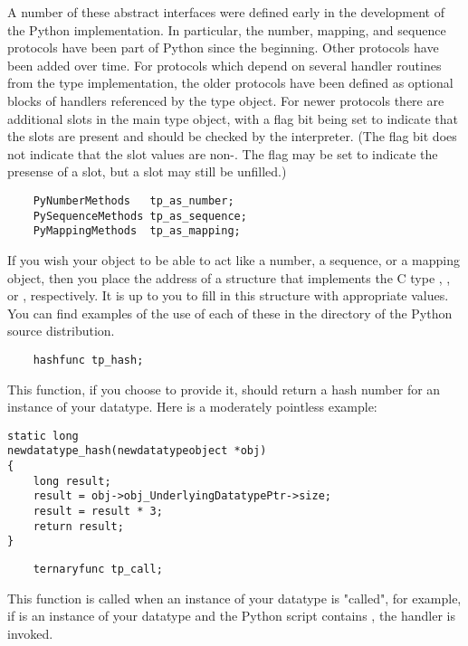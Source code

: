 A number of these abstract interfaces were defined early in the
development of the Python implementation.  In particular, the number,
mapping, and sequence protocols have been part of Python since the
beginning.  Other protocols have been added over time.  For protocols
which depend on several handler routines from the type implementation,
the older protocols have been defined as optional blocks of handlers
referenced by the type object.  For newer protocols there are
additional slots in the main type object, with a flag bit being set to
indicate that the slots are present and should be checked by the
interpreter.  (The flag bit does not indicate that the slot values are
non-\NULL. The flag may be set to indicate the presense of a slot,
but a slot may still be unfilled.)

\begin{verbatim}
    PyNumberMethods   tp_as_number;
    PySequenceMethods tp_as_sequence;
    PyMappingMethods  tp_as_mapping;
\end{verbatim}

If you wish your object to be able to act like a number, a sequence,
or a mapping object, then you place the address of a structure that
implements the C type ,
, or , respectively.
It is up to you to fill in this structure with appropriate values. You
can find examples of the use of each of these in the 
directory of the Python source distribution.


\begin{verbatim}
    hashfunc tp_hash;
\end{verbatim}

This function, if you choose to provide it, should return a hash
number for an instance of your datatype. Here is a moderately
pointless example:

\begin{verbatim}
static long
newdatatype_hash(newdatatypeobject *obj)
{
    long result;
    result = obj->obj_UnderlyingDatatypePtr->size;
    result = result * 3;
    return result;
}
\end{verbatim}

\begin{verbatim}
    ternaryfunc tp_call;
\end{verbatim}

This function is called when an instance of your datatype is "called",
for example, if  is an instance of your datatype and the Python
script contains , the  handler is
invoked.

